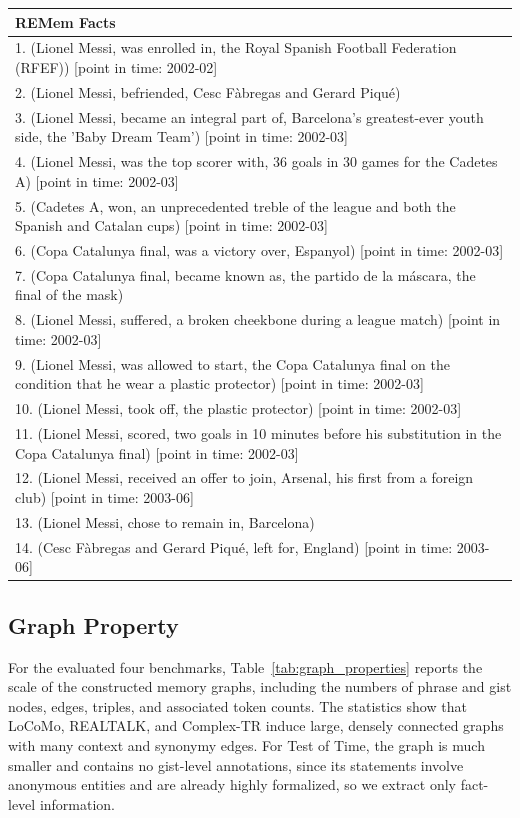 \documentclass{article} %
\newcommand{\ours}{REMem\xspace}
\begin{document}
\begin{longtable}{p{\dimexpr\textwidth-2\tabcolsep}}
\textbf{\ours Facts} \\ 
\midrule
1. (Lionel Messi, was enrolled in, the Royal Spanish Football Federation (RFEF)) [point in time: 2002-02] \\
2. (Lionel Messi, befriended, Cesc Fàbregas and Gerard Piqué) \\
3. (Lionel Messi, became an integral part of, Barcelona's greatest-ever youth side, the 'Baby Dream Team') [point in time: 2002-03] \\
4. (Lionel Messi, was the top scorer with, 36 goals in 30 games for the Cadetes A) [point in time: 2002-03] \\
5. (Cadetes A, won, an unprecedented treble of the league and both the Spanish and Catalan cups) [point in time: 2002-03] \\
6. (Copa Catalunya final, was a victory over, Espanyol) [point in time: 2002-03] \\
7. (Copa Catalunya final, became known as, the partido de la máscara, the final of the mask) \\
8. (Lionel Messi, suffered, a broken cheekbone during a league match) [point in time: 2002-03] \\
9. (Lionel Messi, was allowed to start, the Copa Catalunya final on the condition that he wear a plastic protector) [point in time: 2002-03] \\
10. (Lionel Messi, took off, the plastic protector) [point in time: 2002-03] \\
11. (Lionel Messi, scored, two goals in 10 minutes before his substitution in the Copa Catalunya final) [point in time: 2002-03] \\
12. (Lionel Messi, received an offer to join, Arsenal, his first from a foreign club) [point in time: 2003-06] \\
13. (Lionel Messi, chose to remain in, Barcelona) \\
14. (Cesc Fàbregas and Gerard Piqué, left for, England) [point in time: 2003-06] \\
\end{longtable}


\subsection{Graph Property}
\label{subsec:graph_property}

For the evaluated four benchmarks, Table~\ref{tab:graph_properties} reports the scale of the constructed memory graphs, including the numbers of phrase and gist nodes, edges, triples, and associated token counts. 
The statistics show that LoCoMo, REALTALK, and Complex-TR induce large, densely connected graphs with many context and synonymy edges.
For Test of Time, the graph is much smaller and contains no gist-level annotations, since its statements involve anonymous entities and are already highly formalized, so we extract only fact-level information.
\end{document}
